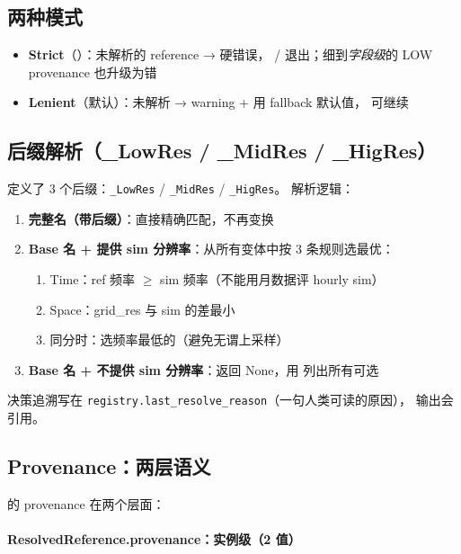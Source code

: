 \subsection{两种模式}

\begin{itemize}
  \item \textbf{Strict}（）：未解析的 reference → 硬错误， /  退出；细到\emph{字段级}的 LOW provenance 也升级为错
  \item \textbf{Lenient}（默认）：未解析 → warning + 用 fallback 默认值， 可继续
\end{itemize}

\subsection{后缀解析（\_LowRes / \_MidRes / \_HigRes）}

 定义了 3 个后缀：\texttt{\_LowRes} / \texttt{\_MidRes} / \texttt{\_HigRes}。 解析逻辑：

\begin{enumerate}
  \item \textbf{完整名（带后缀）}：直接精确匹配，不再变换
  \item \textbf{Base 名 + 提供 sim 分辨率}：从所有变体中按 3 条规则选最优：
  \begin{enumerate}
    \item Time：ref 频率 $\geq$ sim 频率（不能用月数据评 hourly sim）
    \item Space：grid\_res 与 sim 的差最小
    \item 同分时：选频率最低的（避免无谓上采样）
  \end{enumerate}
  \item \textbf{Base 名 + 不提供 sim 分辨率}：返回 None，用  列出所有可选
\end{enumerate}

决策追溯写在 \texttt{registry.last\_resolve\_reason}（一句人类可读的原因）， 输出会引用。

\subsection{Provenance：两层语义}

\openbench{} 的 provenance 在两个层面：

\paragraph{ResolvedReference.provenance：实例级（2 值）}

